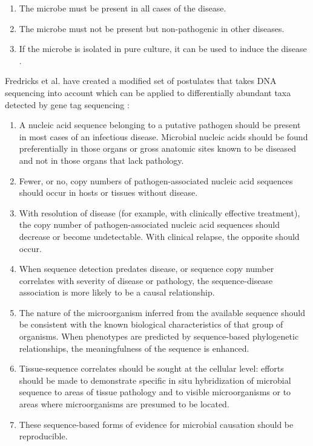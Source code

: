 \begin{enumerate}
\item The microbe must be present in all cases of the disease.
\item The microbe must not be present but non-pathogenic in other diseases.
\item If the microbe is isolated in pure culture, it can be used to induce the disease \cite{koch1891uber}.
\end{enumerate}

Fredricks et al. have created a modified set of postulates that takes DNA sequencing into account which can be applied to differentially abundant taxa detected by gene tag sequencing \cite{fredericks1996sequence}:

\begin{enumerate}
\item A nucleic acid sequence belonging to a putative pathogen should be present in most cases of an infectious disease. Microbial nucleic acids should be found preferentially in those organs or gross anatomic sites known to be diseased and not in those organs that lack pathology.
\item Fewer, or no, copy numbers of pathogen-associated nucleic acid sequences should occur in hosts or tissues without disease.
\item With resolution of disease (for example, with clinically effective treatment), the copy number of pathogen-associated nucleic acid sequences should decrease or become undetectable. With clinical relapse, the opposite should occur.
\item When sequence detection predates disease, or sequence copy number correlates with severity of disease or pathology, the sequence-disease association is more likely to be a causal relationship.
\item The nature of the microorganism inferred from the available sequence should be consistent with the known biological characteristics of that group of organisms. When phenotypes are predicted by sequence-based phylogenetic relationships, the meaningfulness of the sequence is enhanced.
\item Tissue-sequence correlates should be sought at the cellular level: efforts should be made to demonstrate specific in situ hybridization of microbial sequence to areas of tissue pathology and to visible microorganisms or to areas where microorganisms are presumed to be located.
\item These sequence-based forms of evidence for microbial causation should be reproducible.
\end{enumerate}

